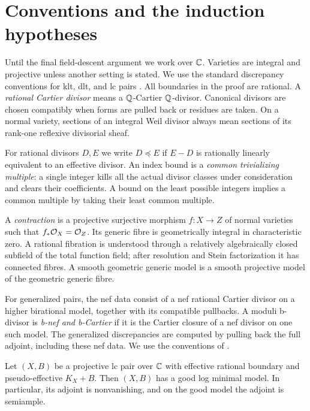 \section{Conventions and the induction hypotheses}\label{sec:preliminaries}

Until the final field-descent argument we work over $\mathbb C$. Varieties are
integral and projective unless another setting is stated. We use the
standard discrepancy conventions for klt, dlt, and lc pairs
\cite{Kollar2013}. All boundaries in the proof are rational. A
\emph{rational Cartier divisor} means a $\mathbb Q$-Cartier $\mathbb Q$-divisor.
Canonical divisors are chosen compatibly when forms are pulled back
or residues are taken. On a normal variety, sections of an integral
Weil divisor always mean sections of its rank-one reflexive divisorial
sheaf.

For rational divisors $D,E$ we write $D\preceq E$ if $E-D$ is rationally
linearly equivalent to an effective divisor. An index bound is a
\emph{common trivializing multiple}: a single integer kills all the
actual divisor classes under consideration and clears their
coefficients. A bound on the least possible integers implies a common
multiple by taking their least common multiple.

A \emph{contraction} is a projective surjective morphism
$f:X\to Z$ of normal varieties such that $f_*\mathcal O_X=\mathcal O_Z$. Its generic
fibre is geometrically integral in characteristic zero. A rational
fibration is understood through a relatively algebraically closed
subfield of the total function field; after resolution and Stein
factorization it has connected fibres. A smooth geometric generic
model is a smooth projective model of the geometric generic fibre.

For generalized pairs, the nef data consist of a nef rational Cartier
divisor on a higher birational model, together with its compatible
pullbacks. A moduli b-divisor is \emph{b-nef and b-Cartier} if it is the
Cartier closure of a nef divisor on one such model. The generalized
discrepancies are computed by pulling back the full adjoint, including
these nef data. We use the conventions of \cite{BirkarZhang2016}.

\begin{theorem}
\label{thm:good-models}
Let $(X,B)$ be a projective lc pair over $\mathbb C$ with effective rational
boundary and pseudo-effective $K_X+B$. Then $(X,B)$ has a good log
minimal model. In particular, its adjoint is nonvanishing, and on the
good model the adjoint is semiample.
\end{theorem}

